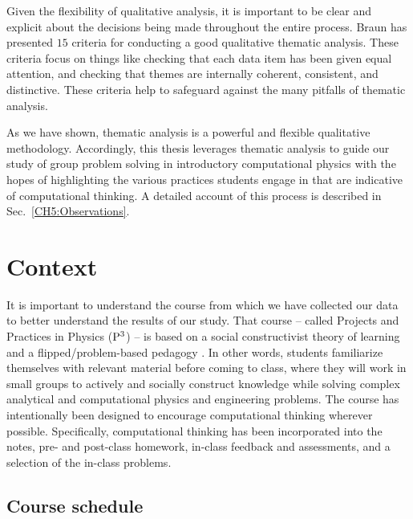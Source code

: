 \documentclass{msuphddissertation}
\begin{document}
\begin{doublespace}
Given the flexibility of qualitative analysis, it is important to be clear and explicit about the decisions being made throughout the entire process.  Braun has presented $15$ criteria for conducting a good qualitative thematic analysis.  These criteria focus on things like checking that each data item has been given equal attention, and checking that themes are internally coherent, consistent, and distinctive.  These criteria help to safeguard against the many pitfalls of thematic analysis.

As we have shown, thematic analysis is a powerful and flexible qualitative methodology.  Accordingly, this thesis leverages thematic analysis to guide our study of group problem solving in introductory computational physics with the hopes of highlighting the various practices students engage in that are indicative of computational thinking.  A detailed account of this process is described in Sec.~\ref{CH5:Observations}.

%
%
%
%
%
%
%
%
%
%
%
%
%
%
%
%

\chapter{Context}\label{CH3:Context}

It is important to understand the course from which we have collected our data to better understand the results of our study.  That course -- called Projects and Practices in Physics (${\rm P}^{3}$) -- is based on a social constructivist theory of learning and a flipped/problem-based pedagogy \cite{Irving2017}.  In other words, students familiarize themselves with relevant material before coming to class, where they will work in small groups to actively and socially construct knowledge while solving complex analytical and computational physics and engineering problems.  The course has intentionally been designed to encourage computational thinking wherever possible.  Specifically, computational thinking has been incorporated into the notes, pre- and post-class homework, in-class feedback and assessments, and a selection of the in-class problems.

\section{Course schedule}


\end{doublespace}
\end{document}
